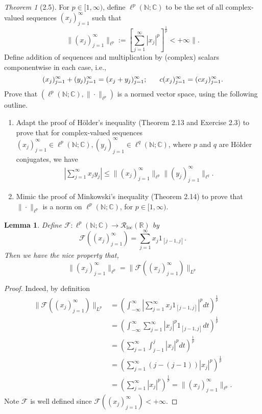 \documentclass[12pt]{article}
\newtheorem{lemma}{Lemma}
\theoremstyle{remark}
\theoremstyle{named}
\newtheorem*{theorem}{Theorem}
\newcommand{\N}{\mathbb N}
\newcommand{\R}{\mathbb R}
\newcommand{\C}{\mathbb C}
\newcommand{\abs}[1]{|#1|}
\newcommand{\bigabs}[1]{\left|#1\right|}
\begin{document}
\begin{theorem}[2.5]
    For \(p \in [1, \infty)\), define \(\ell^p(\N;\C)\) to be the set of all complex-valued sequences \((x_j)_{j = 1}^\infty\) such that
    \[\|(x_j)_{j = 1}^\infty\|_{\ell^p} := \left[\sum_{j = 1}^\infty \abs{x_j}^p\right]^{\frac{1}{p}} < + \infty\|.\]
    Define addition of sequences and multiplication by (complex) scalars componentwise in each case, i.e., 
    \[(x_j)_{j = 1}^\infty + (y_j)_{j = 1}^\infty = (x_j + y_j)_{j = 1}^\infty; \hspace*{6mm} c(x_j)_{j = 1}^\infty = (cx_j)_{j = 1}^\infty.\]
    Prove that \((\ell^p(\N;\C), \|\cdot\|_{\ell^p})\) is a normed vector space, using the following outline.
    \begin{enumerate}
        \item Adapt the proof of H\"older's inequality (Theorem 2.13 and Exercise 2.3) to prove that for complex-valued sequences \((x_j)_{j = 1}^\infty \in \ell^p(\N;\C), (y_j)_{j = 1}^\infty \in \ell^q(\N;\C)\), where \(p\) and \(q\) are H\"older conjugates, we have 
        \begin{align*}
            \bigabs{\sum_{j = 1}^{\infty} x_j y_j} \leq \|(x_j)_{j = 1}^\infty\|_{\ell^p} \|(y_j)_{j = 1}^\infty\|_{\ell^q}.
        \end{align*}
        \item Mimic the proof of Minkowski's inequality (Theorem 2.14) to prove that \(\|\cdot\|_{\ell^p}\) is a norm on \(\ell^p(\N;\C)\), for \(p \in [1, \infty)\).
    \end{enumerate}
\end{theorem}

\begin{lemma}
    Define \(\mathcal{F} : \ell^p(\N;\C) \to \mathcal{R}_\text{loc}(\R)\) by
    \[\mathcal{F}((x_j)_{j = 1}^\infty) = \sum_{j = 1}^\infty x_j 1_{[j - 1, j]}.\]
    Then we have the nice property that,
    \[\|(x_j)_{j = 1}^\infty\|_{\ell^p} = \|\mathcal{F}((x_j)_{j = 1}^\infty)\|_{L^p}\]
\end{lemma}

\begin{proof}
    Indeed, by definition
    \begin{align*}
        \|\mathcal{F}((x_j)_{j = 1}^\infty)\|_{L^p} &= \left(\int_{-\infty}^{\infty} \bigabs{\sum_{j = 1}^{\infty} x_j 1_{[j - 1, j]}}^p dt\right)^\frac{1}{p} \\&= \left(\int_{-\infty}^{\infty} \sum_{j = 1}^{\infty} \abs{x_j}^p 1_{[j - 1, j]} dt\right)^\frac{1}{p} \\
        &= \left(\sum_{j = 1}^{\infty} \int_{j - 1}^{j}\abs{x_j}^p dt\right)^\frac{1}{p} \\
        &= \left(\sum_{j = 1}^{\infty} (j - (j - 1))\abs{x_j}^p\right)^\frac{1}{p} \\
        &= \left(\sum_{j = 1}^{\infty}\abs{x_j}^p\right)^\frac{1}{p} = \|(x_j)_{j = 1}^\infty\|_{\ell^p}.
    \end{align*}
    Note \(\mathcal{F}\) is well defined since \(\mathcal{F}((x_j)_{j = 1}^\infty) < +\infty\).
\end{proof}
\end{document}

